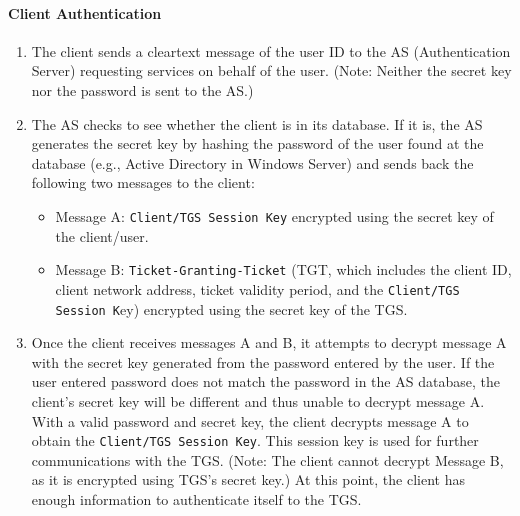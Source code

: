 \paragraph{Client Authentication}

\begin{enumerate}
	\item The client sends a cleartext message of the user ID to the AS (Authentication Server) requesting services on behalf of the user. (Note: Neither the secret key nor the password is sent to the AS.)
	\item The AS checks to see whether the client is in its database. If it is, the AS generates the secret key by hashing the password of the user found at the database (e.g., Active Directory in Windows Server) and sends back the following two messages to the client:
	      \begin{itemize}
		      \item Message A: \texttt{Client/TGS Session Key} encrypted using the secret key of the client/user.
		      \item Message B: \texttt{Ticket-Granting-Ticket} (TGT, which includes the client ID, client network address, ticket validity period, and the \texttt{Client/TGS Session K}ey) encrypted using the secret key of the TGS.
	      \end{itemize}
	\item Once the client receives messages A and B, it attempts to decrypt message A with the secret key generated from the password entered by the user. If the user entered password does not match the password in the AS database, the client's secret key will be different and thus unable to decrypt message A. With a valid password and secret key, the client decrypts message A to obtain the \texttt{Client/TGS Session Key}. This session key is used for further communications with the TGS. (Note: The client cannot decrypt Message B, as it is encrypted using TGS's secret key.) At this point, the client has enough information to authenticate itself to the TGS.
\end{enumerate}



